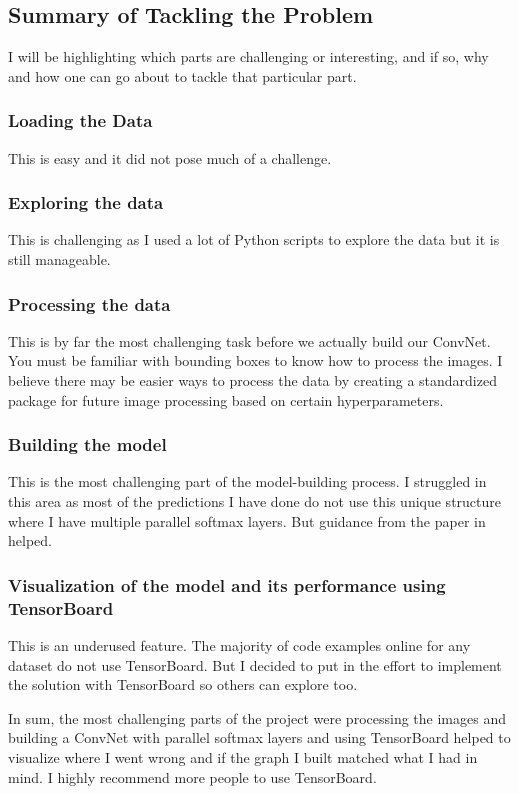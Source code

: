 \documentclass[twoside, column]{article}
\begin{document}
\subsection{Summary of Tackling the Problem}
I will be highlighting which parts are challenging or interesting, and if so, why and how one can go about to tackle that particular part.

\subsubsection{Loading the Data}
This is easy and it did not pose much of a challenge.

\subsubsection{Exploring the data}
This is challenging as I used a lot of Python scripts to explore the data but it is still manageable. 

\subsubsection{Processing the data}
This is by far the most challenging task before we actually build our ConvNet. You must be familiar with bounding boxes to know how to process the images. I believe there may be easier ways to process the data by creating a standardized package for future image processing based on certain hyperparameters. 

\subsubsection{Building the model}
This is the most challenging part of the model-building process. I struggled in this area as most of the predictions I have done do not use this unique structure where I have multiple parallel softmax layers. But guidance from the paper in \cite{Goodfellow:2013aa} helped. 

\subsubsection{Visualization of the model and its performance using TensorBoard}
This is an underused feature. The majority of code examples online for any dataset do not use TensorBoard. But I decided to put in the effort to implement the solution with TensorBoard so others can explore too. 

In sum, the most challenging parts of the project were processing the images and building a ConvNet with parallel softmax layers and using TensorBoard helped to visualize where I went wrong and if the graph I built matched what I had in mind. I highly recommend more people to use TensorBoard. 
\end{document}
